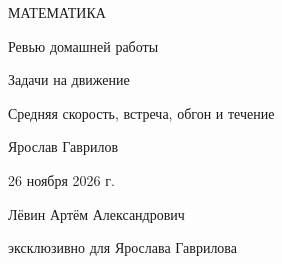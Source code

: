 \documentclass[a4paper,12pt]{article}
\begin{document}
\begin{titlepage}
\centering
\vspace*{25mm}
{\Large\color{darkaccent} МАТЕМАТИКА\par}
\vspace{14mm}
{\huge Ревью домашней работы\par}
\vspace{10mm}
{\LARGE\color{accent} Задачи на движение\par}
\vspace{12mm}
{\large Средняя скорость, встреча, обгон и течение\par}
\vfill
{\large Ярослав Гаврилов\par}
\vspace{8mm}
26 ноября 2026 г.\par
\vspace{16mm}
{\small Лёвин Артём Александрович\par эксклюзивно для Ярослава Гаврилова\par}
\vspace{14mm}
\end{titlepage}
\end{document}
